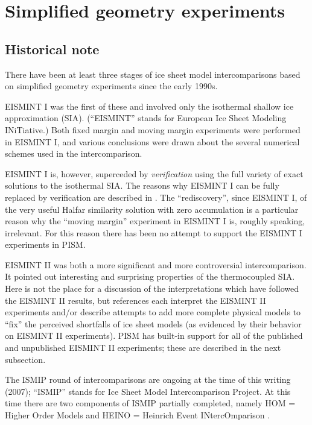 \documentclass[11pt,final]{amsart}
\begin{document}
\clearpage\newpage
\section{Simplified geometry experiments}\label{sect:simp}

\subsection{Historical note}  There have been at least three stages of ice sheet model intercomparisons based on simplified geometry experiments since the early 1990s.

EISMINT I \cite{EISMINT96} was the first of these and involved only the isothermal shallow ice approximation (SIA).  (``EISMINT'' stands for European Ice Sheet Modeling INiTiative.)  Both fixed margin and moving margin experiments were performed in EISMINT I, and various conclusions were drawn about the several numerical schemes used in the intercomparison.  

EISMINT I is, however, superceded by \emph{verification} using the full variety of exact solutions to the isothermal SIA.  The reasons why EISMINT I can be fully replaced by verification are described in \cite{BLKCB}.  The ``rediscovery'', since EISMINT I, of the very useful Halfar similarity solution with zero accumulation \cite{Halfar83} is a particular reason why the ``moving margin'' experiment in EISMINT I is, roughly speaking, irrelevant.  For this reason there has been no attempt to support the EISMINT I experiments in PISM.

EISMINT II \cite{EISMINT00} was both a more significant and more controversial intercomparison.  It pointed out interesting and surprising properties of the thermocoupled SIA.  Here is not the place for a discussion of the interpretations which have followed the EISMINT II results, but references \cite{BBL,Hindmarsh04,Hindmarsh06,PayneBaldwin,SaitoEISMINT} each interpret the EISMINT II experiments and/or describe attempts to add more complete physical models to ``fix'' the perceived shortfalls of ice sheet models (as evidenced by their behavior on EISMINT II experiments).  PISM has built-in support for all of the published and unpublished EISMINT II experiments; these are described in the next subsection.

The ISMIP round of intercomparisons are ongoing at the time of this writing (2007); ``ISMIP'' stands for Ice Sheet Model Intercomparison Project.  At this time there are two components of ISMIP partially completed, namely HOM = Higher Order Models and HEINO = Heinrich Event INtercOmparison \cite{GreveTakahamaCalov}.
\end{document}
